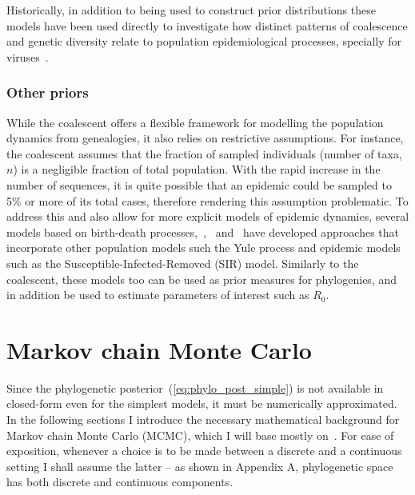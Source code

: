 Historically, in addition to being used to construct prior distributions these models have been used directly to investigate how distinct patterns of coalescence and genetic diversity relate to population epidemiological processes, specially for viruses~\citep{Rodrigo1999,Pybus2000,Pybus2009}.

\subsubsection{Other priors}

While the coalescent offers a flexible framework for modelling the population dynamics from genealogies, it also relies on restrictive assumptions.
For instance, the coalescent assumes that the fraction of sampled individuals (number of taxa, $n$) is a negligible fraction of total population.
With the rapid increase in the number of sequences, it is quite possible that an epidemic could be sampled to 5\% or more of its total cases, therefore rendering this assumption problematic.
To address this and also allow for more explicit models of epidemic dynamics, several models based on birth-death processes,~\cite{Volz2009},~\cite{Rasmussen2011} and~\cite{Stadler2011} have developed approaches that incorporate other population models such the Yule process and epidemic models such as the Susceptible-Infected-Removed (SIR) model.
Similarly to the coalescent, these models too can be used as prior measures for phylogenies, and in addition be used to estimate parameters of interest such as $R_0$.

\section{Markov chain Monte Carlo}
\label{sec:mcmc}

Since the phylogenetic posterior~(\ref{eq:phylo_post_simple}) is not available in closed-form even for the simplest models, it must be numerically approximated.
In the following sections I introduce the necessary mathematical background for Markov chain Monte Carlo (MCMC), which I will base mostly on~\cite{Geyer2011}.
For ease of exposition, whenever a choice is to be made between a discrete and a continuous setting I shall assume the latter -- as shown in Appendix A, phylogenetic space has both discrete and continuous components.

